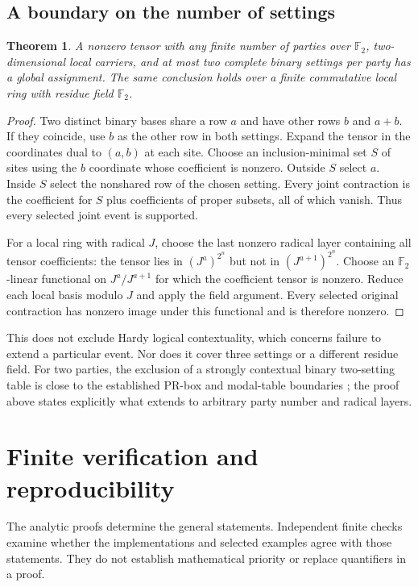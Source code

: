 \documentclass[11pt]{article}
\newtheorem{theorem}{Theorem}[section]
\theoremstyle{definition}\newtheorem{definition}[theorem]{Definition}
\theoremstyle{remark}\newtheorem{remark}[theorem]{Remark}
\newcommand{\F}{\mathbb F}
\begin{document}
\subsection{A boundary on the number of settings}
\begin{theorem}\label{thm:two}
A nonzero tensor with any finite number of parties over $\F_2$, two-dimensional local carriers, and at most two complete binary settings per party has a global assignment. The same conclusion holds over a finite commutative local ring with residue field $\F_2$.
\end{theorem}
\begin{proof}
Two distinct binary bases share a row $a$ and have other rows $b$ and $a+b$. If they coincide, use $b$ as the other row in both settings. Expand the tensor in the coordinates dual to $(a,b)$ at each site. Choose an inclusion-minimal set $S$ of sites using the $b$ coordinate whose coefficient is nonzero. Outside $S$ select $a$. Inside $S$ select the nonshared row of the chosen setting. Every joint contraction is the coefficient for $S$ plus coefficients of proper subsets, all of which vanish. Thus every selected joint event is supported.

For a local ring with radical $J$, choose the last nonzero radical layer containing all tensor coefficients: the tensor lies in $(J^a)^{2^n}$ but not in $(J^{a+1})^{2^n}$. Choose an $\F_2$-linear functional on $J^a/J^{a+1}$ for which the coefficient tensor is nonzero. Reduce each local basis modulo $J$ and apply the field argument. Every selected original contraction has nonzero image under this functional and is therefore nonzero.
\end{proof}
This does not exclude Hardy logical contextuality, which concerns failure to extend a particular event. Nor does it cover three settings or a different residue field. For two parties, the exclusion of a strongly contextual binary two-setting table is close to the established PR-box and modal-table boundaries \cite{AbramskyBrandenburger2011,Schumacher2012}; the proof above states explicitly what extends to arbitrary party number and radical layers.

\section{Finite verification and reproducibility}\label{sec:verification}
The analytic proofs determine the general statements. Independent finite checks examine whether the implementations and selected examples agree with those statements. They do not establish mathematical priority or replace quantifiers in a proof.
\end{document}

